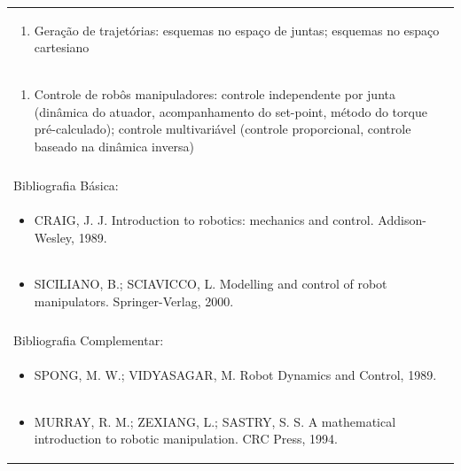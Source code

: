 \documentclass[11pt]{article}
\begin{document}
\begin{center}
\begin{longtable}{|p{4cm}|p{4cm}|p{4cm}|p{4cm}|}
\multicolumn{4}{|p{\dimexpr 16cm + 6\tabcolsep\relax}|}{\begin{enumerate}[start=6]\item Geração de trajetórias: esquemas no espaço de juntas; esquemas no espaço cartesiano\end{enumerate}}\\
\multicolumn{4}{|p{\dimexpr 16cm + 6\tabcolsep\relax}|}{\begin{enumerate}[start=7]\item Controle de robôs manipuladores: controle independente por junta (dinâmica do atuador, acompanhamento do set-point, método do torque pré-calculado); controle multivariável (controle proporcional, controle baseado na dinâmica inversa)\end{enumerate}}\\
\multicolumn{4}{|p{\dimexpr 16cm + 6\tabcolsep\relax}|}{}\\
\hline
\multicolumn{4}{|p{16cm}|}{Bibliografia Básica:}\\*
\multicolumn{4}{|p{\dimexpr 16cm + 6\tabcolsep\relax}|}{\begin{itemize}\item CRAIG, J. J. Introduction to robotics: mechanics and control. Addison-Wesley, 1989.\end{itemize}}\\
\multicolumn{4}{|p{\dimexpr 16cm + 6\tabcolsep\relax}|}{\begin{itemize}\item SICILIANO, B.; SCIAVICCO, L. Modelling and control of robot manipulators. Springer-Verlag, 2000.\end{itemize}}\\
\multicolumn{4}{|p{16cm}|}{}\\
\hline
\multicolumn{4}{|p{16cm}|}{Bibliografia Complementar:}\\*
\multicolumn{4}{|p{\dimexpr 16cm + 6\tabcolsep\relax}|}{\begin{itemize}\item SPONG, M. W.; VIDYASAGAR, M. Robot Dynamics and Control, 1989.\end{itemize}}\\
\multicolumn{4}{|p{\dimexpr 16cm + 6\tabcolsep\relax}|}{\begin{itemize}\item MURRAY, R. M.; ZEXIANG, L.; SASTRY, S. S. A mathematical introduction to robotic manipulation. CRC Press, 1994.\end{itemize}}\\
\hline
\end{longtable}
\end{center}
\end{document}
